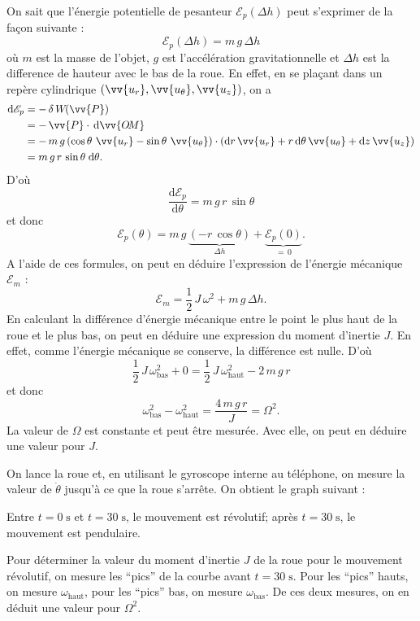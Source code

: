 \documentclass[a4paper]{report}
\let\vec\vv
\begin{document}
	On sait que l'énergie potentielle de pesanteur $\mathcal{E}_{p}(\Delta h)$ peut s'exprimer de la façon suivante : \[
		\mathcal{E}_p(\Delta h) = m\, g\, \Delta h
	\] où $m$ est la masse de l'objet, $g$ est l'accélération gravitationnelle et $\Delta h$ est la difference de hauteur avec le bas de la roue. En effet, en se plaçant dans un repère cylindrique $(\vec{u_r}, \vec{u_\theta}, \vec{u_z})$, on a
	\begin{align*}
		\mathrm{d}\mathcal{E}_p &= -\,\delta\,W\!(\vec{P})\\
		&= -\,\vec{P}\cdot\, \mathrm{d} \vec{O\!M} \\
		&= -\,m\,g\,(\cos \theta\ \vec{u_r} - \sin \theta\ \vec{u_\theta}) \cdot (\mathrm{d}r\,\vec{u_r} + r\,\mathrm{d}\theta\,\vec{u_{\theta}} + \mathrm{d}z\, \vec{u_z}) \\
		&= m\,g\,r\,\sin \theta\;\mathrm{d}\theta. \\
	\end{align*}
	D'où \[
		\frac{\mathrm{d}\mathcal{E}_p}{\mathrm{d}\theta} = m\,g\,r\,\sin\theta
	\] et donc \[
		\mathcal{E}_p(\theta) = m\,g\,\underbrace{(-r\,\cos \theta)}_{\Delta h} + \underbrace{\mathcal{E}_p(0)}_{=\, 0}.
	\] A l'aide de ces formules, on peut en déduire l'expression de l'énergie mécanique $\mathcal{E}_m$ : \[
		\mathcal{E}_m = \frac{1}{2}\,J\,\omega^2 + m\,g\,\Delta h.
	\] En calculant la différence d'énergie mécanique entre le point le plus haut de la roue et le plus bas, on peut en déduire une expression du moment d'inertie $J$. En effet, comme l'énergie mécanique se conserve, la différence est nulle. D'où \[
		\frac{1}{2}\,J\,\omega^2_{\text{bas}} + 0 = \frac{1}{2}\,J\,\omega^2_{\text{haut}} - 2\,m\,g\,r
	\] et donc \[
		\omega^2_{\text{bas}} - \omega^2_{\text{haut}} = \frac{4\,m\,g\,r}{J} = \Omega^2.
	\] La valeur de $\Omega$ est constante et peut être mesurée. Avec elle, on peut en déduire une valeur pour $J$.

	On lance la roue et, en utilisant le gyroscope interne au téléphone, on mesure la valeur de $\dot\theta$ jusqu'à ce que la roue s'arrête. On obtient le graph suivant :
	\begin{figure}[H]
		\centering
		
	\end{figure}

	Entre $t = 0\;\mbox{s}$ et $t = 30\;\text{s}$, le mouvement est révolutif; {\sc a}près $t = 30\; \text{s}$, le mouvement est pendulaire.

	Pour déterminer la valeur du moment d'inertie $J$ de la roue pour le mouvement révolutif, on mesure les ``pics'' de la courbe avant $t = 30\;\text{s}$. Pour les ``pics'' hauts, on mesure $\omega_{\text{haut}}$, pour les ``pics'' bas, on mesure $\omega_{\text{bas}}$. De ces deux mesures, on en déduit une valeur pour $\Omega^2$.
\end{document}
